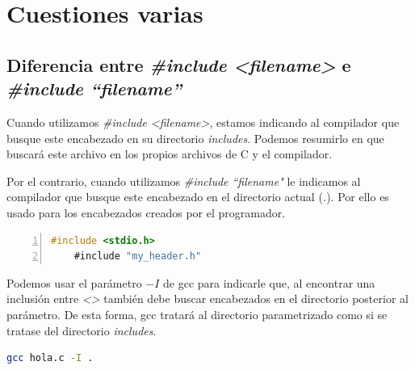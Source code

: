 \documentclass[a4paper, 11pt, titlepage]{article}
\begin{document}

\section{Cuestiones varias}

    \subsection{Diferencia entre \textit{\#include \textless filename\textgreater} e \textit{\#include ``filename''}}

        Cuando utilizamos \textit{\#include \textless filename\textgreater}, estamos indicando al compilador
        que busque este encabezado en su directorio \textit{includes}. Podemos resumirlo en 
        que buscará este archivo en los propios archivos de C y el compilador.  

        Por el contrario, cuando utilizamos \textit{\#include ``filename"} le indicamos al compilador que busque
        este encabezado en el directorio actual (\textit{.}). Por ello es usado para los encabezados
        creados por el programador.

        \begin{lstlisting}[language=C,numbers=left]
    #include <stdio.h>
    #include "my_header.h"\end{lstlisting}

        Podemos usar el parámetro $-I$ de gcc para indicarle que, al encontrar una inclusión 
        entre \textit{\textless\textgreater} también debe buscar encabezados en el directorio 
        posterior al parámetro. De esta forma, gcc tratará al directorio parametrizado como 
        si se tratase del directorio \textit{includes}.
        
        \begin{lstlisting}[language=bash]
    gcc hola.c -I .\end{lstlisting}
    
\end{document}
